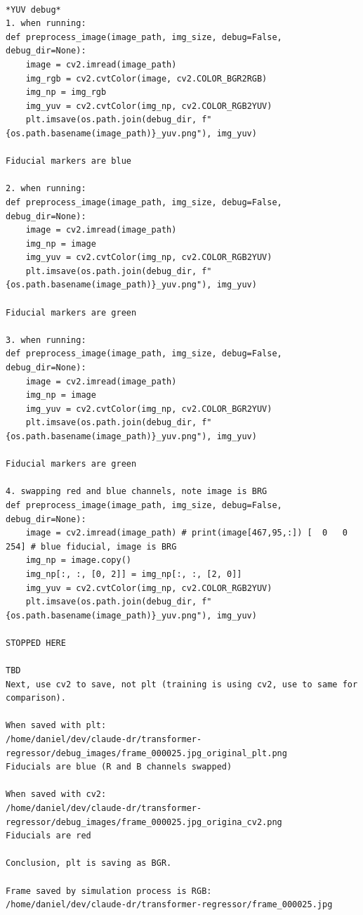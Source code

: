 \begin{verbatim}

*YUV debug*
1. when running:
def preprocess_image(image_path, img_size, debug=False, debug_dir=None):
    image = cv2.imread(image_path)
    img_rgb = cv2.cvtColor(image, cv2.COLOR_BGR2RGB)
    img_np = img_rgb
    img_yuv = cv2.cvtColor(img_np, cv2.COLOR_RGB2YUV) 
    plt.imsave(os.path.join(debug_dir, f"{os.path.basename(image_path)}_yuv.png"), img_yuv)

Fiducial markers are blue

2. when running:
def preprocess_image(image_path, img_size, debug=False, debug_dir=None):
    image = cv2.imread(image_path)
    img_np = image
    img_yuv = cv2.cvtColor(img_np, cv2.COLOR_RGB2YUV) 
    plt.imsave(os.path.join(debug_dir, f"{os.path.basename(image_path)}_yuv.png"), img_yuv)

Fiducial markers are green

3. when running:
def preprocess_image(image_path, img_size, debug=False, debug_dir=None):
    image = cv2.imread(image_path)
    img_np = image
    img_yuv = cv2.cvtColor(img_np, cv2.COLOR_BGR2YUV) 
    plt.imsave(os.path.join(debug_dir, f"{os.path.basename(image_path)}_yuv.png"), img_yuv)

Fiducial markers are green

4. swapping red and blue channels, note image is BRG
def preprocess_image(image_path, img_size, debug=False, debug_dir=None):
    image = cv2.imread(image_path) # print(image[467,95,:]) [  0   0 254] # blue fiducial, image is BRG
    img_np = image.copy()
    img_np[:, :, [0, 2]] = img_np[:, :, [2, 0]]
    img_yuv = cv2.cvtColor(img_np, cv2.COLOR_RGB2YUV) 
    plt.imsave(os.path.join(debug_dir, f"{os.path.basename(image_path)}_yuv.png"), img_yuv)

STOPPED HERE

TBD
Next, use cv2 to save, not plt (training is using cv2, use to same for comparison).

When saved with plt:
/home/daniel/dev/claude-dr/transformer-regressor/debug_images/frame_000025.jpg_original_plt.png
Fiducials are blue (R and B channels swapped)

When saved with cv2:
/home/daniel/dev/claude-dr/transformer-regressor/debug_images/frame_000025.jpg_origina_cv2.png
Fiducials are red

Conclusion, plt is saving as BGR.

Frame saved by simulation process is RGB:
/home/daniel/dev/claude-dr/transformer-regressor/frame_000025.jpg


\end{verbatim}
